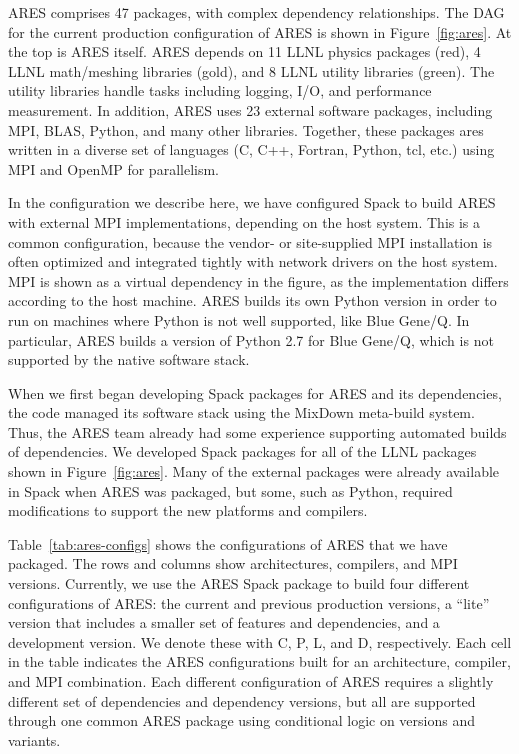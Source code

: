 ARES comprises 47 packages, with complex dependency relationships.  The DAG for
the current production configuration of ARES is shown in Figure~\ref{fig:ares}.
At the top is ARES itself.  ARES depends on 11 LLNL physics packages (red),
4 LLNL math/meshing libraries (gold), and 8 LLNL utility libraries (green).
The utility libraries handle tasks including logging, I/O, and performance
measurement. In addition, ARES uses 23 external software packages, including MPI, BLAS,
Python, and many other libraries.  Together, these packages ares written in a diverse
set of languages (C, C++, Fortran, Python, tcl, etc.) using MPI and OpenMP for parallelism.

In the configuration we describe here, we have configured Spack to build ARES with
external MPI implementations, depending on the host system. This is a common
configuration, because the vendor- or site-supplied MPI installation is often
optimized and integrated tightly with network drivers on the host system. MPI is shown
as a virtual dependency in the figure, as the implementation differs according to the
host machine.  ARES builds its own Python version in order to run on machines
where Python is not well supported, like Blue Gene/Q.  In particular, ARES builds
a version of Python 2.7 for Blue Gene/Q, which is not supported by the native
software stack.

When we first began developing Spack packages for ARES and its dependencies,
the code managed its software stack using the MixDown meta-build system.
Thus, the ARES team already had some experience supporting automated builds of
dependencies. We developed Spack packages for all of the LLNL packages shown in
Figure~\ref{fig:ares}.
Many of the external packages were already available in Spack when ARES was
packaged, but some, such as Python, required modifications to support the
new platforms and compilers.

Table~\ref{tab:ares-configs} shows the configurations of ARES that we have packaged.
The rows and columns show architectures, compilers, and MPI versions.
Currently, we use the ARES Spack package to build four different configurations
of ARES: the current and previous production versions, a ``lite'' version that includes
a smaller set of features and dependencies, and a development version.  We denote these
with C, P, L, and D, respectively.  Each cell in the table indicates the
ARES configurations built for an architecture, compiler, and MPI combination.
Each different configuration of ARES requires a slightly different set of
dependencies and dependency versions, but all are supported through one common
ARES package using conditional logic on versions and variants.

